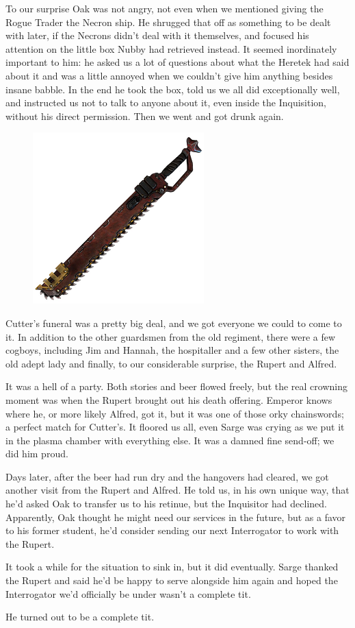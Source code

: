 To our surprise Oak was not angry, not even when we mentioned giving the Rogue Trader the Necron ship. 
He shrugged that off as something to be dealt with later, if the Necrons didn’t deal with it themselves, and focused his attention on the little box Nubby had retrieved instead. 
It seemed inordinately important to him: 
he asked us a lot of questions about what the Heretek had said about it and was a little annoyed when we couldn’t give him anything besides insane babble. 
In the end he took the box, told us we all did exceptionally well, and instructed us not to talk to anyone about it, even inside the Inquisition, without his direct permission. 
Then we went and got drunk again.

\begin{figure}
	\begin{center}
		\includegraphics[width=\figwidth]{pics/8/62.png}
	\end{center}
\end{figure}
Cutter’s funeral was a pretty big deal, and we got everyone we could to come to it. 
In addition to the other guardsmen from the old regiment, there were a few cogboys, including Jim and Hannah, the hospitaller and a few other sisters, the old adept lady and finally, to our considerable surprise, the Rupert and Alfred.

It was a hell of a party. 
Both stories and beer flowed freely, but the real crowning moment was when the Rupert brought out his death offering. 
Emperor knows where he, or more likely Alfred, got it, but it was one of those orky chainswords; 
a perfect match for Cutter’s. 
It floored us all, even Sarge was crying as we put it in the plasma chamber with everything else. 
It was a damned fine send-off; 
we did him proud.

Days later, after the beer had run dry and the hangovers had cleared, we got another visit from the Rupert and Alfred. 
He told us, in his own unique way, that he’d asked Oak to transfer us to his retinue, but the Inquisitor had declined. 
Apparently, Oak thought he might need our services in the future, but as a favor to his former student, he’d consider sending our next Interrogator to work with the Rupert.

It took a while for the situation to sink in, but it did eventually. 
Sarge thanked the Rupert and said he’d be happy to serve alongside him again and hoped the Interrogator we’d officially be under wasn’t a complete tit.

He turned out to be a complete tit.
